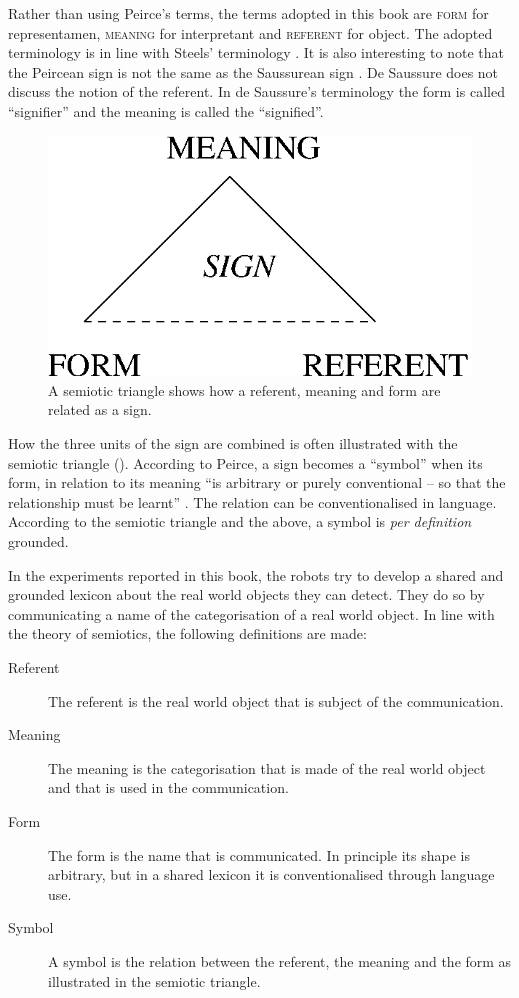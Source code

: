 

Rather than using Peirce's terms, the terms adopted in this book are {\scshape form} for representamen, {\scshape meaning} for interpretant and {\scshape referent} for object. The adopted terminology is in line with Steels' terminology \citep{steels:2000}. It is also interesting to note that the Peircean sign is not the same as the Saussurean sign \citep{saussure:1974}. De Saussure does not discuss the notion of the referent. In de Saussure's terminology the form is called ``signifier'' and the meaning is called the ``signified''.

\begin{figure}
\centerline{\includegraphics[width=.33\textwidth]{introduction/semiotic3.eps}}
\caption{A semiotic triangle shows how a referent, meaning and form are related as a sign.}
\label{f:intro:semiotic}
\end{figure}

How the three units of the sign are combined is often illustrated with the semiotic triangle (). According to Peirce, a sign becomes a ``symbol'' when its form, in relation to its meaning ``is arbitrary or purely conventional -- so that the relationship must be learnt'' \citep{chandler:1994}. The relation can be conventionalised in language. According to the semiotic triangle and the above, a symbol is {\em per definition} grounded.

In the experiments reported in this book, the robots try to develop a shared and grounded lexicon about the real world objects they can detect. They do so by communicating a name of the categorisation of a real world object. In line with the theory of semiotics, the following definitions are made:

\begin{description}

\item[Referent] The referent is the real world object that is subject of the communication.

\item[Meaning] The meaning is the categorisation that is made of the real world object and that is used in the communication.

\item[Form] The form is the name that is communicated. In principle its shape is arbitrary, but in a shared lexicon it is conventionalised through language use.

\item[Symbol] A symbol is the relation between the referent, the meaning and the form as illustrated in the semiotic triangle.

\end{description}


